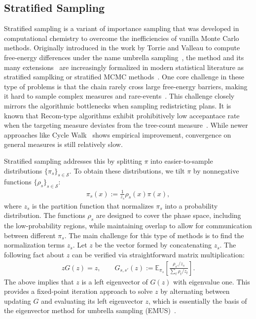 \subsection{Stratified Sampling}\label{subsec:umbrella_mbar}
Stratified sampling is a variant of importance sampling that was developed in computational chemistry to overcome the inefficiencies of vanilla Monte Carlo methods.
Originally introduced in the work by Torrie and Valleau to compute free-energy differences under the name umbrella sampling~\cite{torrie1977nonphysical}, the method and its many extensions~\cite{kumar1992weighted,shirts2008statistically} are increasingly formalized in modern statistical literature as stratified samplking or stratified MCMC methods~\cite{dinner2018trajectory}.
One core challenge in these type of problems is that the chain rarely cross large free-energy barriers, making it hard to sample complex measures and rare-events~\cite{kastner2011umbrella,kumar1992weighted}.
This challenge closely mirrors the algorithmic bottlenecks when sampling redistricting plans.
It is known that Recom-type algorithms exhibit prohibitively low accepantace rate when the targeting measure deviates from the tree-count measure~\cite{autry2020multi}.
While newer approaches like Cycle Walk~\cite{cyclewalk} shows empirical improvement, convergence on general measures is still relatively slow.

Stratified sampling addresses this by splitting $\pi$ into easier-to-sample distributions $\{\pi_s\}_{s\in\mathcal{S}}$.
To obtain these distributions, we tilt $\pi$ by nonnegative functions $\{\rho_s\}_{s\in\mathcal{S}}$:
\begin{align}
    \pi_s(x):=\frac{1}{z_s}\rho_s(x)\pi(x),
\end{align}
where $z_s$ is the partition function that normalizes $\pi_s$ into a probability distribution.
The functions $\rho_s$ are designed to cover the phase space, including the low-probability regions, while maintaining overlap to allow for communication between different $\pi_s$.
The main challenge for this type of methods is to find the normalization terms $z_s$.
Let $z$ be the vector formed by concatenating $z_s$.
The following fact about $z$ can be verified via straightforward matrix multiplication:
\begin{align}\label{eqn: umbrella fixed point}
    zG(z)=z,\quad\quad G_{s,s'}(z):=\mathbb{E}_{\pi_s}\left[\frac{\rho_{s'}/z_{s}}{\sum_{t}\rho_{t}/z_{t}}\right].
\end{align}
The above implies that $z$ is a left eigenvector of $G(z)$ with eigenvalue one.
This provides a fixed-point iteration approach to solve $z$ by alternating between updating $G$ and evaluating its left eigenvector $z$, which is essentially the basis of the eigenvector method for umbrella sampling (EMUS)~\cite{dinner2020stratification,matthews2018umbrella}.

